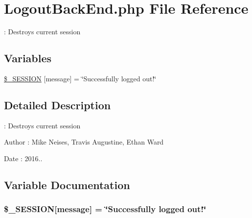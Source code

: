 \hypertarget{_logout_back_end_8php}{}\section{Logout\+Back\+End.\+php File Reference}
\label{_logout_back_end_8php}


\+: Destroys current session  


\subsection*{Variables}
\begin{DoxyCompactItemize}
\item 
\hyperlink{_logout_back_end_8php_aa437b8f5fd6a6e8c01b1fda06822f050}{\$\+\_\+\+S\+E\+S\+S\+I\+ON} \mbox{[}\textquotesingle{}message\textquotesingle{}\mbox{]} = \char`\"{}Successfully logged out!\char`\"{}
\end{DoxyCompactItemize}


\subsection{Detailed Description}
\+: Destroys current session 

\begin{DoxyAuthor}{Author}
\+: Mike Neises, Travis Augustine, Ethan Ward 
\end{DoxyAuthor}
\begin{DoxyDate}{Date}
\+: 2016.. 
\end{DoxyDate}


\subsection{Variable Documentation}
\subsubsection[{\texorpdfstring{\$\+\_\+\+S\+E\+S\+S\+I\+ON}{$_SESSION}}]{\setlength{\rightskip}{0pt plus 5cm}\$\+\_\+\+S\+E\+S\+S\+I\+ON\mbox{[}\textquotesingle{}message\textquotesingle{}\mbox{]} = \char`\"{}Successfully logged out!\char`\"{}}\hypertarget{_logout_back_end_8php_aa437b8f5fd6a6e8c01b1fda06822f050}{}\label{_logout_back_end_8php_aa437b8f5fd6a6e8c01b1fda06822f050}

